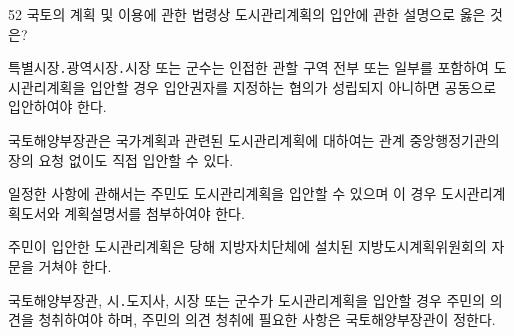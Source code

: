 \begin{question}{52}
국토의 계획 및 이용에 관한 법령상 도시관리계획의 입안에 관한 설명으로 옳은 것은?
\begin{choices}
  \item 특별시장․광역시장․시장 또는 군수는 인접한 관할 구역 전부 또는 일부를 포함하여 도시관리계획을 입안할 경우 입안권자를 지정하는 협의가 성립되지 아니하면 공동으로 입안하여야 한다.
  \item 국토해양부장관은 국가계획과 관련된 도시관리계획에 대하여는 관계 중앙행정기관의 장의 요청 없이도 직접 입안할 수 있다.
  \item 일정한 사항에 관해서는 주민도 도시관리계획을 입안할 수 있으며 이 경우 도시관리계획도서와 계획설명서를 첨부하여야 한다.
  \item 주민이 입안한 도시관리계획은 당해 지방자치단체에 설치된 지방도시계획위원회의 자문을 거쳐야 한다.
  \item 국토해양부장관, 시․도지사, 시장 또는 군수가 도시관리계획을 입안할 경우 주민의 의견을 청취하여야 하며, 주민의 의견 청취에 필요한 사항은 국토해양부장관이 정한다.
\end{choices}
\end{question}
